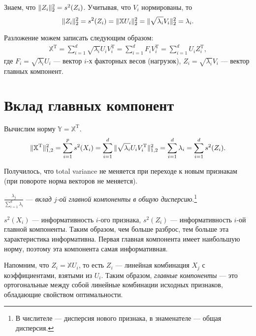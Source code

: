 \documentclass[specialist, 12pt,
subf, %
href, colorlinks=true,
substylefile = spbu.rtx,
]{disser}
\begin{document}
Знаем, что $\Arrowvert Z_i\Arrowvert^2_2 = s^2(Z_i)$. Учитывая, что $V_i$ нормированы, то
\begin{gather*}
\Arrowvert Z_i\Arrowvert^2_2 = s^2(Z_i) = \Arrowvert \mathbb{X} U_i \Arrowvert ^2_2 = \Arrowvert \sqrt{\lambda_i}V_i \Arrowvert^2_2 = \lambda_i.
\end{gather*}

Разложение можем записать следующим образом:
\begin{gather*}
\mathbb{X}^\mathrm{T}=\sum\limits_{i =1}^d \sqrt{\lambda_i} U_i V_i^{\mathrm{T}} = \sum\limits_{i =1}^d F_i V_i^\mathrm{T} = \sum\limits_{i =1}^d U_i Z_i^\mathrm{T},
\end{gather*}
где $F_i=\sqrt{\lambda_i} U_i$ --- вектор $i$-х факторных весов (нагрузок), $Z_i=\sqrt{\lambda_i} V_i$ --- вектор главных компонент.

\section{Вклад главных компонент}

Вычислим норму $\mathbb{Y}=\mathbb{X}^\mathrm{T}$.
\begin{equation*}
\Arrowvert \mathbb{X}^\mathrm{T}\Arrowvert_{1,2}^2 = \sum\limits_{i = 1}^p s^2(X_i) = \sum\limits_{i =1}^d \Arrowvert \sqrt{\lambda_i}U_i V_i^\mathrm{T} \Arrowvert_{1,2}^2 = \sum\limits_{i =1}^d \lambda_i = \sum\limits_{i =1}^d s^2(Z_i).
\end{equation*}

Получилось, что total variance не меняется при переходе к новым признакам (при повороте норма векторов не меняется).

$\frac{\lambda_j}{\sum\limits_{i=1}^d \lambda_i}$ --- \textit{вклад $j$-ой главной компоненты в общую дисперсию}.\footnote{В числителе --- дисперсия нового признака, в знаменателе --- общая дисперсия.}

$s^2(X_i)$ --- информативность $i$-ого признака, $s^2(Z_i)$ --- информативность $i$-ой главной компоненты. Таким образом, чем больше разброс, тем больше эта характеристика информативна. Первая главная компонента имеет наибольшую норму, поэтому эта компонента самая информативная.

Напомним, что $Z_i=\mathbb{X}U_i$, то есть $Z_i$ --- линейная комбинация $X_j$ с коэффициентами, взятыми из $U_i$. Таким образом, \textit{главные компоненты} --- это ортогональные между собой линейные комбинации исходных признаков, обладающие свойством оптимальности.\\
\end{document}
